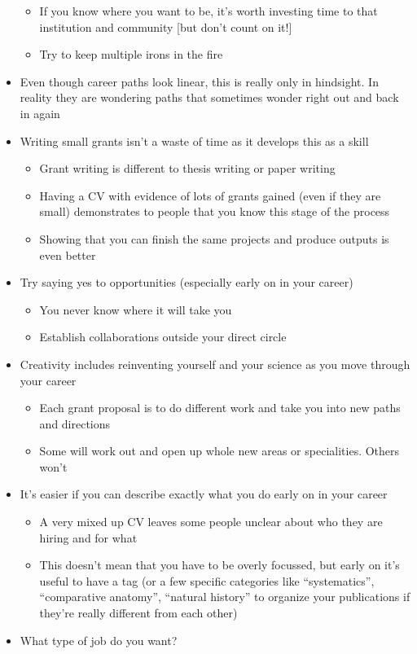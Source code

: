 \documentclass[
]{krantz}
\providecommand{\tightlist}{%
  \setlength{\itemsep}{0pt}\setlength{\parskip}{0pt}}
\begin{document}
\begin{itemize}
  \begin{itemize}
  \tightlist
  \item
    If you know where you want to be, it's worth investing time to that institution and community {[}but don't count on it!{]}
  \item
    Try to keep multiple irons in the fire
  \end{itemize}
\item
  Even though career paths look linear, this is really only in hindsight. In reality they are wondering paths that sometimes wonder right out and back in again
\item
  Writing small grants isn't a waste of time as it develops this as a skill

  \begin{itemize}
  \tightlist
  \item
    Grant writing is different to thesis writing or paper writing
  \item
    Having a CV with evidence of lots of grants gained (even if they are small) demonstrates to people that you know this stage of the process
  \item
    Showing that you can finish the same projects and produce outputs is even better
  \end{itemize}
\item
  Try saying yes to opportunities (especially early on in your career)

  \begin{itemize}
  \tightlist
  \item
    You never know where it will take you
  \item
    Establish collaborations outside your direct circle
  \end{itemize}
\item
  Creativity includes reinventing yourself and your science as you move through your career

  \begin{itemize}
  \tightlist
  \item
    Each grant proposal is to do different work and take you into new paths and directions
  \item
    Some will work out and open up whole new areas or specialities. Others won't
  \end{itemize}
\item
  It's easier if you can describe exactly what you do early on in your career

  \begin{itemize}
  \tightlist
  \item
    A very mixed up CV leaves some people unclear about who they are hiring and for what
  \item
    This doesn't mean that you have to be overly focussed, but early on it's useful to have a tag (or a few specific categories like ``systematics'', ``comparative anatomy'', ``natural history'' to organize your publications if they're really different from each other)
  \end{itemize}
\item
  What type of job do you want?


\end{itemize}
\end{document}
